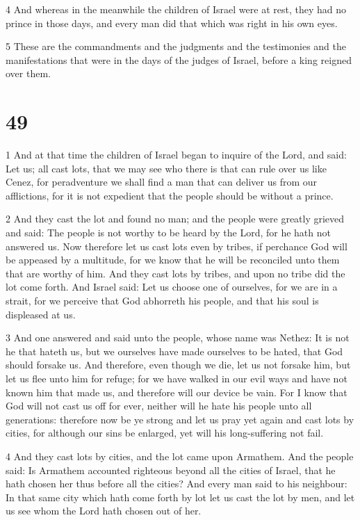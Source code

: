 \par 4 And whereas in the meanwhile the children of Israel were at rest, they had no prince in those days, and every man did that which was right in his own eyes.

\par 5 These are the commandments and the judgments and the testimonies and the manifestations that were in the days of the judges of Israel, before a king reigned over them.

\chapter{49}

\par 1 And at that time the children of Israel began to inquire of the Lord, and said: Let us; all cast lots, that we may see who there is that can rule over us like Cenez, for peradventure we shall find a man that can deliver us from our afflictions, for it is not expedient that the people should be without a prince. 

\par 2 And they cast the lot and found no man; and the people were greatly grieved and said: The people is not worthy to be heard by the Lord, for he hath not answered us. Now therefore let us cast lots even by tribes, if perchance God will be appeased by a multitude, for we know that he will be reconciled unto them that are worthy of him. And they cast lots by tribes, and upon no tribe did the lot come forth. And Israel said: Let us choose one of ourselves, for we are in a strait, for we perceive that God abhorreth his people, and that his soul is displeased at us. 

\par 3 And one answered and said unto the people, whose name was Nethez: It is not he that hateth us, but we ourselves have made ourselves to be hated, that God should forsake us. And therefore, even though we die, let us not forsake him, but let us flee unto him for refuge; for we have walked in our evil ways and have not known him that made us, and therefore will our device be vain. For I know that God will not cast us off for ever, neither will he hate his people unto all generations: therefore now be ye strong and let us pray yet again and cast lots by cities, for although our sins be enlarged, yet will his long-suffering not fail. 

\par 4 And they cast lots by cities, and the lot came upon Armathem. And the people said: Is Armathem accounted righteous beyond all the cities of Israel, that he hath chosen her thus before all the cities? And every man said to his neighbour: In that same city which hath come forth by lot let us cast the lot by men, and let us see whom the Lord hath chosen out of her. 


